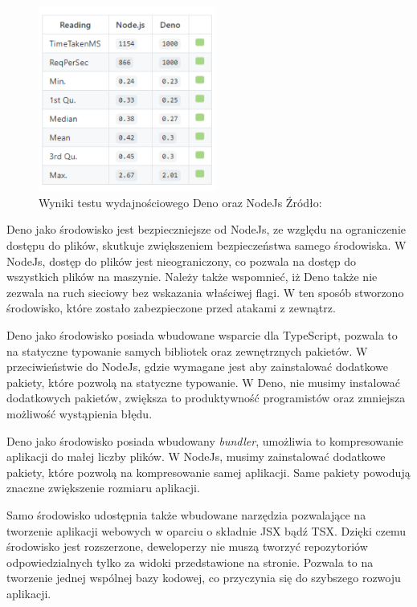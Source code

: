 \begin{figure}[H]
  \centering
  \includegraphics[width=0.52\textwidth]{Figures/deno_performance.png}
  \caption{Wyniki testu wydajnościowego Deno oraz NodeJs Źródło: \cite{deno_performance}}
  \label{fig:deno_vs_node}
\end{figure}

Deno jako środowisko jest bezpieczniejsze od NodeJs, ze względu na ograniczenie dostępu do plików, skutkuje zwiększeniem bezpieczeństwa samego środowiska. W NodeJs, dostęp do plików jest nieograniczony, co pozwala na dostęp do wszystkich plików na maszynie. Należy także wspomnieć, iż Deno także nie zezwala na ruch sieciowy bez wskazania właściwej flagi. W ten sposób stworzono środowisko, które zostało zabezpieczone przed atakami z zewnątrz.

Deno jako środowisko posiada wbudowane wsparcie dla TypeScript, pozwala to na statyczne typowanie samych bibliotek oraz zewnętrznych pakietów. W przeciwieństwie do NodeJs, gdzie wymagane jest aby zainstalować dodatkowe pakiety, które pozwolą na statyczne typowanie. W Deno, nie musimy instalować dodatkowych pakietów, zwiększa to produktywność programistów oraz zmniejsza możliwość wystąpienia błędu.

Deno jako środowisko posiada wbudowany \textit{bundler}, umożliwia to kompresowanie aplikacji do małej liczby plików. W NodeJs, musimy zainstalować dodatkowe pakiety, które pozwolą na kompresowanie samej aplikacji. Same pakiety powodują znaczne zwiększenie rozmiaru aplikacji.

Samo środowisko udostępnia także wbudowane narzędzia pozwalające na tworzenie aplikacji webowych w oparciu o składnie JSX bądź TSX. Dzięki czemu środowisko jest rozszerzone, deweloperzy nie muszą tworzyć repozytoriów odpowiedzialnych tylko za widoki przedstawione na stronie. Pozwala to na tworzenie jednej wspólnej bazy kodowej, co przyczynia się do szybszego rozwoju aplikacji.

